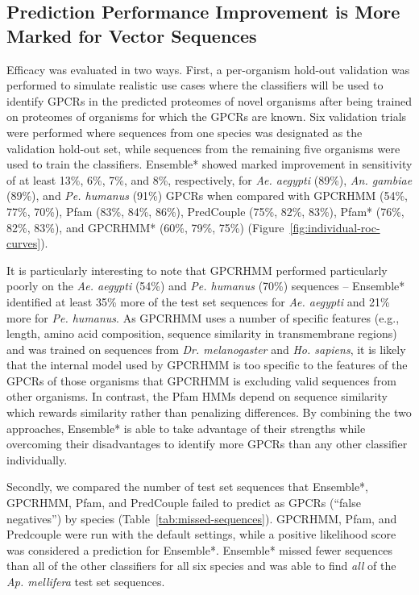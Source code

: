 \subsection{Prediction Performance Improvement is More Marked for Vector Sequences}

Efficacy was evaluated in two ways.  First, a per-organism hold-out validation was performed to simulate realistic use cases where the classifiers will be used to identify GPCRs in the predicted proteomes of novel organisms after being trained on proteomes of organisms for which the GPCRs are known.  Six validation trials were performed where sequences from one species was designated as the validation hold-out set, while sequences from the remaining five organisms were used to train the classifiers. Ensemble* showed marked improvement in sensitivity of at least 13\%, 6\%, 7\%, and 8\%, respectively, for \emph{Ae. aegypti} (89\%), \emph{An. gambiae} (89\%), and \emph{Pe. humanus} (91\%) GPCRs when compared with GPCRHMM (54\%, 77\%, 70\%), Pfam (83\%, 84\%, 86\%), PredCouple (75\%, 82\%, 83\%), Pfam* (76\%, 82\%, 83\%), and GPCRHMM* (60\%, 79\%, 75\%) (Figure~\ref{fig:individual-roc-curves}).

 It is particularly interesting to note that GPCRHMM performed particularly poorly on the \emph{Ae. aegypti} (54\%) and \emph{Pe. humanus} (70\%) sequences -- Ensemble* identified at least 35\% more of the test set sequences for \emph{Ae. aegypti} and 21\% more for \emph{Pe. humanus}. As GPCRHMM uses a number of specific features (e.g., length, amino acid composition, sequence similarity in transmembrane regions) and was trained on sequences from \emph{Dr. melanogaster} and \emph{Ho. sapiens}, it is likely that the internal model used by GPCRHMM is too specific to the features of the GPCRs of those organisms that GPCRHMM is excluding valid sequences from other organisms.  In contrast, the Pfam HMMs depend on sequence similarity which rewards similarity rather than penalizing differences.  By combining the two approaches, Ensemble* is able to take advantage of their strengths while overcoming their disadvantages to identify more GPCRs than any other classifier individually.

Secondly, we compared the number of test set sequences that Ensemble*, GPCRHMM, Pfam, and PredCouple failed to predict as GPCRs (``false negatives'') by species (Table~\ref{tab:missed-sequences}). GPCRHMM, Pfam, and Predcouple were run with the default settings, while a positive likelihood score was considered a prediction for Ensemble*. Ensemble* missed fewer sequences than all of the other classifiers for all six species and  was able to find \emph{all} of the \emph{Ap. mellifera} test set sequences.

